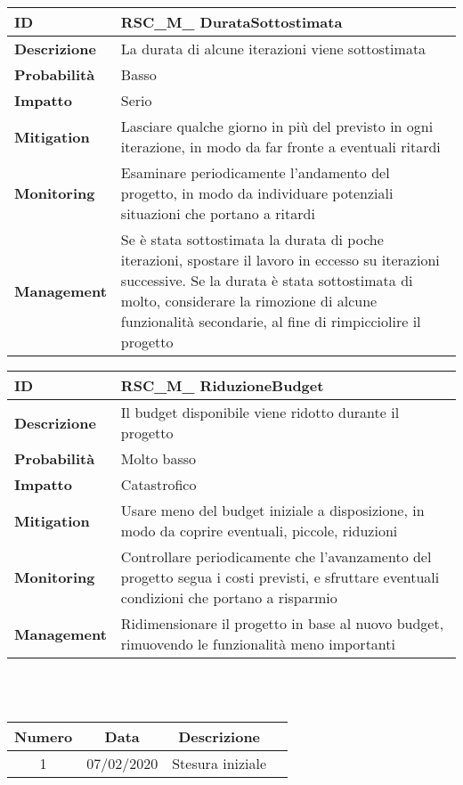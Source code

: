 \begin{tabular}{|p{2.2cm}|p{9.6cm}| }
 	\hline
	\textbf{ID} & RSC\_M\_ DurataSottostimata\\ [0.5ex] 
	\hline
	\textbf{Descrizione} & La durata di alcune iterazioni viene sottostimata \\ 
	\hline
	\textbf{Probabilità} & Basso\\ 
	\hline
	\textbf{Impatto} & Serio\\
	\hline
	\textbf{Mitigation} & Lasciare qualche giorno in più del previsto in ogni iterazione, in modo da far fronte a eventuali ritardi\\ 
	\hline
	\textbf{Monitoring} & Esaminare periodicamente l'andamento del progetto, in modo da individuare potenziali situazioni che portano a ritardi\\ 
	\hline
	\textbf{Management} & Se è stata sottostimata la durata di poche iterazioni, spostare il lavoro in eccesso su iterazioni successive. Se la durata è stata sottostimata di molto, considerare la rimozione di alcune funzionalità secondarie, al fine di rimpicciolire il progetto\\ 
	\hline
\end{tabular}

\begin{tabular}{|p{2.2cm}|p{9.6cm}| }
 	\hline
	\textbf{ID} & RSC\_M\_ RiduzioneBudget\\ [0.5ex] 
	\hline
	\textbf{Descrizione} & Il budget disponibile viene ridotto durante il progetto\\ 
	\hline
	\textbf{Probabilità} & Molto basso\\ 
	\hline
	\textbf{Impatto} & Catastrofico\\
	\hline
	\textbf{Mitigation} & Usare meno del budget iniziale a disposizione, in modo da coprire eventuali, piccole, riduzioni\\
	\hline
	\textbf{Monitoring} & Controllare periodicamente che l'avanzamento del progetto segua i costi previsti, e sfruttare eventuali condizioni che portano a risparmio\\ 
	\hline
	\textbf{Management} & Ridimensionare il progetto in base al nuovo budget, rimuovendo le funzionalità meno importanti\\ 
	\hline
\end{tabular}

\newpage
{} \\ \\
\begin{tabular}{|c | c | c | c|} 
 	\hline
	 Numero & Data & Descrizione \\ [0.5ex] 
	\hline\hline
	1 & 07/02/2020 & Stesura iniziale \\ 
	\hline
\end{tabular}